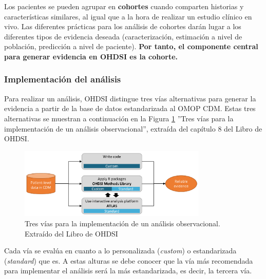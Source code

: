 Los pacientes se pueden agrupar en \textbf{cohortes} cuando comparten historias y características similares, al igual que a la hora de realizar un estudio clínico en vivo. Las diferentes  prácticas para los análisis de cohortes darán lugar a los diferentes tipos de evidencia deseada (caracterización, estimación a nivel de población, predicción a nivel de paciente). \textbf{Por tanto, el componente central para generar evidencia en OHDSI es la cohorte.}


\subsubsection{Implementación del análisis}

Para realizar un análisis, OHDSI distingue tres vías alternativas para generar la evidencia a partir de la base de datos estandarizada al OMOP CDM. Estas tres alternativas se muestran a continuación en la Figura \ref{fig:analysisImplementations} ''Tres vías para la implementación de un análisis observacional'', extraída del capítulo 8 del Libro de OHDSI.

\begin{figure}[H]
    \centering
    \includegraphics[width=0.80\textwidth]{figures/analysisImplementations.png}
     \caption{Tres vías para la implementación de un análisis observacional. Extraído del Libro de OHDSI \cite{OHDSIbook}}
    \label{fig:analysisImplementations}
\end{figure}

Cada vía se evalúa en cuanto a lo personalizada (\textit{custom}) o estandarizada (\textit{standard}) que es. A estas alturas se debe conocer que la vía más recomendada para implementar el análisis será la más estandarizada, es decir, la tercera vía.

